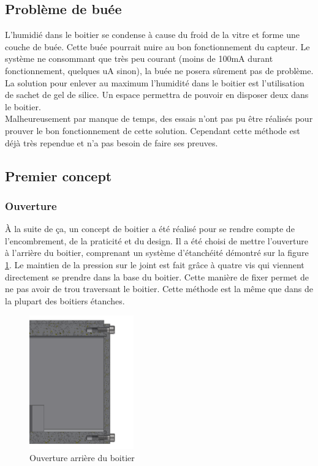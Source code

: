 \subsection{Problème de buée}

L’humidié dans le boitier se condense à cause du froid de la vitre et forme une couche de buée. Cette buée 
pourrait nuire au bon fonctionnement du capteur. Le système ne consommant que très peu courant (moins de 
100mA durant fonctionnement, quelques uA sinon), la buée ne posera sûrement pas de problème. La solution 
pour enlever au maximum l’humidité dans le boitier est l'utilisation de sachet de gel de silice. Un espace permettra 
de pouvoir en disposer deux dans le boitier. \\
Malheureusement par manque de temps, des essais n’ont pas pu être réalisés pour prouver le bon fonctionnement 
de cette solution. Cependant cette méthode est déjà très rependue et n’a pas besoin de faire ses preuves.

\subsection{Premier concept}

\subsubsection{Ouverture}

À la suite de ça, un concept de boitier a été réalisé pour se rendre compte de l’encombrement, de la 
praticité et du design. Il a été choisi de mettre l'ouverture à l’arrière du boitier, comprenant un
système d’étanchéité démontré sur la figure \ref{fig:vuearriereboitier}. Le maintien de la pression 
sur le joint est fait grâce à quatre vis qui viennent directement se prendre dans la base du boitier. 
Cette manière de fixer permet de ne pas avoir de trou traversant le boitier. Cette méthode est la 
même que dans de la plupart des boitiers étanches.

\begin{figure}[H]
    \centering
    \includegraphics[width=0.4\textwidth]{Images/photos_PGA/Arrièreboitierv3coté.PNG}
    \caption{Ouverture arrière du boitier}
    \label{fig:vuearriereboitier}
\end{figure}

